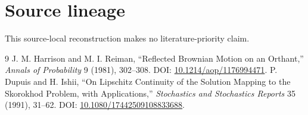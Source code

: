 \documentclass[10pt]{article}
\begin{document}
\section*{Source lineage}
This source-local reconstruction makes no literature-priority claim.
\begin{thebibliography}{9}
J. M. Harrison and M. I. Reiman, ``Reflected Brownian Motion on an
Orthant,'' \emph{Annals of Probability} 9 (1981), 302--308. DOI:
\href{https://doi.org/10.1214/aop/1176994471}{10.1214/aop/1176994471}.
P. Dupuis and H. Ishii, ``On Lipschitz Continuity of the Solution Mapping to
the Skorokhod Problem, with Applications,'' \emph{Stochastics and Stochastics
Reports} 35 (1991), 31--62. DOI:
\href{https://doi.org/10.1080/17442509108833688}%
{10.1080/17442509108833688}.
\end{thebibliography}
\end{document}
